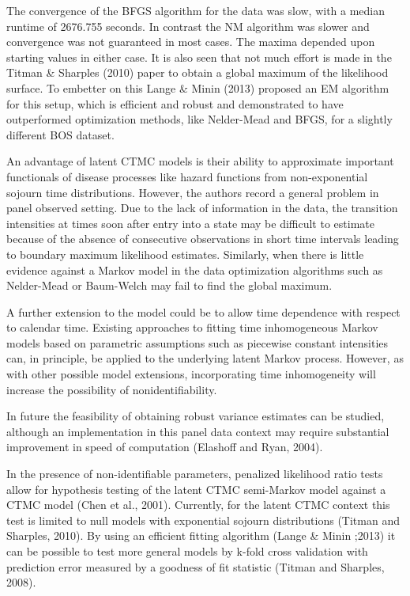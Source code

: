 \documentclass{uwstat572}
\begin{document}
The convergence of the BFGS algorithm for the data was slow, with a median runtime of 2676.755 seconds. In contrast the NM algorithm was slower and convergence was not guaranteed in most cases. The maxima depended upon starting values in either case. It is also seen that not much effort is made in the Titman \& Sharples (2010) paper to obtain a global maximum of the likelihood surface. To embetter on this Lange \& Minin (2013) proposed an EM algorithm for this setup, which is efficient and robust and demonstrated to have outperformed optimization methods, like Nelder-Mead and BFGS, for a slightly different BOS dataset.

An advantage of latent CTMC models is their ability to approximate important functionals of disease processes like hazard functions from non-exponential sojourn time distributions. However, the authors record a general problem in panel observed setting. Due to the lack of information in the data, the transition intensities at times soon after entry into a state may be difficult to estimate because of the absence of consecutive observations in short time intervals leading to boundary maximum likelihood estimates. Similarly, when there is little evidence against a Markov model in the data optimization algorithms such as Nelder-Mead or Baum-Welch may fail to find the global maximum.

A further extension to the model could be to allow time dependence with respect to calendar time. Existing approaches to fitting time inhomogeneous Markov models based on parametric assumptions such as piecewise constant intensities can, in principle, be applied to the underlying latent Markov process. However, as with other possible model extensions, incorporating time inhomogeneity will increase the possibility of nonidentifiability.

In future the feasibility of obtaining robust variance estimates can be studied, although an implementation in this panel data context may require substantial improvement in speed of computation (Elashoff and Ryan, 2004).

In the presence of non-identifiable parameters, penalized likelihood ratio tests allow for hypothesis testing of the latent CTMC semi-Markov model against a CTMC model (Chen et al., 2001). Currently, for the latent CTMC context this test is limited to null models with exponential sojourn distributions (Titman and Sharples, 2010). By using an efficient fitting algorithm (Lange \& Minin ;2013) it can be possible to test more general models by k-fold cross validation with prediction error measured by a goodness of fit statistic (Titman and Sharples, 2008).
\end{document}
